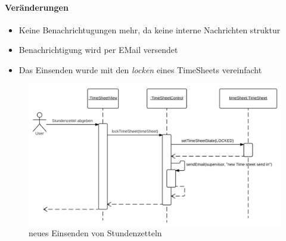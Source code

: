                     \paragraph{Veränderungen}
                    \begin{itemize}
                        \item Keine Benachrichtugungen mehr, da keine interne Nachrichten struktur
                        \item Benachrichtigung wird per EMail versendet
                        \item Das Einsenden wurde mit den \emph{locken} eines TimeSheets vereinfacht
                    \end{itemize}
                    \begin{figure}[H]
                      \centering
                        \includegraphics[scale=0.1]{send-in-timesheet-new.pdf}
                       \caption{neues Einsenden von Stundenzetteln}
                    \end{figure}
